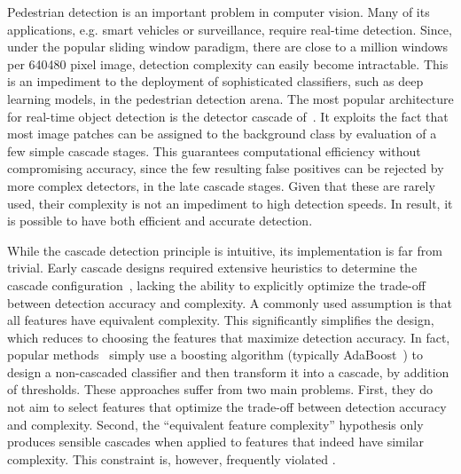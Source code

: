 \documentclass[10pt,twocolumn,letterpaper]{article}
\begin{document}
Pedestrian detection is an important problem in computer vision. Many of
its applications, e.g. smart vehicles or surveillance, require real-time
detection. Since, under the popular sliding window paradigm, there are
close to a million windows per 640480 pixel image, detection
complexity can easily become intractable. This is an impediment to the
deployment of sophisticated classifiers, such as deep learning models,
in the pedestrian detection arena. The most popular architecture for
real-time object detection is the detector cascade
of~\cite{DBLP:journals/ijcv/ViolaJ04}. It exploits the fact that most
image patches can be assigned to the background class by evaluation
of a few simple cascade stages. This guarantees computational efficiency
without compromising accuracy, since the few resulting false positives can be
rejected by more complex detectors, in the late cascade stages. Given that
these are rarely used, their complexity is not an impediment to
high detection speeds. In result, it is possible to have both efficient
and accurate detection.

While the cascade detection principle is intuitive, its implementation
is far from trivial. Early cascade designs required extensive heuristics
to determine the cascade
configuration~\cite{DBLP:journals/ijcv/ViolaJ04,DBLP:conf/iccv/XiaoZZ03,
DBLP:conf/cvpr/BourdevB05}, lacking the ability to explicitly optimize the
trade-off between detection accuracy and complexity. A commonly used
assumption is that all features have equivalent complexity. This
significantly simplifies the design, which reduces to choosing the features
that maximize detection accuracy. In fact, popular
methods~\cite{DBLP:conf/cvpr/BourdevB05,
DBLP:journals/pami/DollarABP14} simply use a boosting algorithm
(typically AdaBoost~\cite{DBLP:conf/eurocolt/FreundS95}) to design a
non-cascaded classifier and then transform it into a cascade, by addition
of thresholds. These approaches suffer from two main
problems. First, they do not aim to select features that optimize
the trade-off between detection accuracy and complexity. Second,
the ``equivalent feature complexity'' hypothesis only produces sensible
cascades when applied to features that indeed have similar complexity.
This constraint is, however, frequently
violated \cite{DBLP:conf/cvpr/BenensonMTG13,
DBLP:conf/eccv/PaisitkriangkraiSH14,DBLP:journals/corr/ZhangBS15}.
\end{document}
